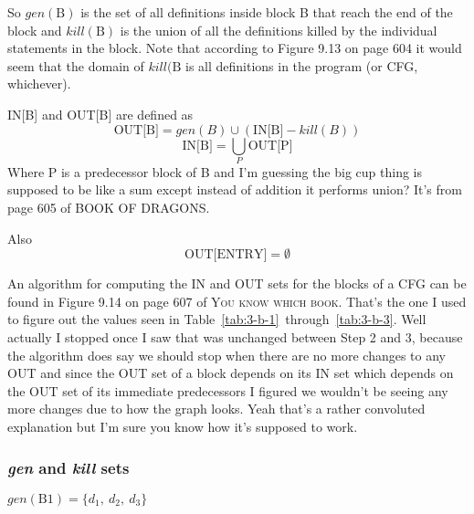 
\newcommand{\IN}[1]{\text{IN[#1]}}
\newcommand{\OUT}[1]{\text{OUT[#1]}}

So $gen(\text{B})$ is the set of all definitions inside block B that reach the end of the block and $kill(\text{B})$ is the union of all the definitions killed by the individual statements in the block.
Note that according to Figure 9.13 on page 604 it would seem that the domain of $kill(\text{B}$ is all definitions in the program (or CFG, whichever).

IN[B] and OUT[B] are defined as
$$\OUT{B} = gen(B) \cup (\IN{B} - kill(B))$$
$$\IN{B} = \bigcup_{P}\OUT{P}$$
Where P is a predecessor block of B and I'm guessing the big cup thing is supposed to be like a sum except instead of addition it performs union?
It's from page 605 of \textsc{BOOK OF DRAGONS}.

Also
$$\OUT{ENTRY} = \emptyset$$

An algorithm for computing the IN and OUT sets for the blocks of a CFG can be found in Figure 9.14 on page 607 of \textsc{You know which book}.
That's the one I used to figure out the values seen in Table~\ref{tab:3-b-1}~through~\ref{tab:3-b-3}.
Well actually I stopped once I saw that \OUT{B1} was unchanged between Step 2 and 3, because the algorithm does say we should stop when there are no more changes to any OUT and since the OUT set of a block depends on its IN set which depends on the OUT set of its immediate predecessors I figured we wouldn't be seeing any more changes due to how the graph looks.
Yeah that's a rather convoluted explanation but I'm sure you know how it's supposed to work.

\renewcommand\thesubsubsection{Step \arabic{subsubsection}}
\setcounter{subsubsection}{-1} %
\subsubsection{\emph{gen} and \emph{kill} sets}

\newcommand{\blockn}{B1}
$gen(\text{B1}) = \{d_1,~d_2,~d_3\}$

